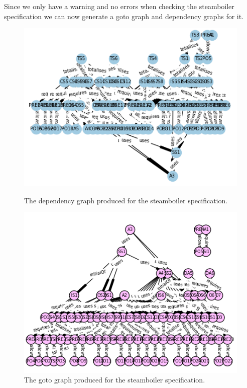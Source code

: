 Since we only have a warning and no errors when checking the steamboiler
specification we can now generate a goto graph and dependency graphs for it.

\begin{figure}[H]
\centering
\begin{minipage}{0.45\textwidth}
\centering
\includegraphics[trim=4cm 1cm 1cm 1cm, scale=0.5]{Figures/Evaluation/25a.png}
\caption{The dependency graph produced for the steamboiler specification. \label{fig:steamdepgraph}}
\end{minipage}\hfill
\begin{minipage}{0.43\textwidth}
\centering
\includegraphics[trim=4cm 1cm 1cm 1cm, scale=0.5]{examples/steamboiler/25b.png}
\caption{The goto graph produced for the steamboiler specification. \label{fig:steamgotograph}}
\end{minipage}
\end{figure}

